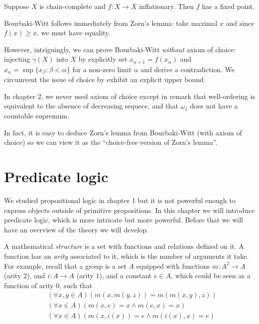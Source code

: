 \documentclass[a4paper]{article}
\begin{document}
\begin{theorem}
  Suppose \(X\) is chain-complete and \(f: X \to X\) inflationary. Then \(f\) has a fixed point.
\end{theorem}

Bourbaki-Witt follows immediately from Zorn's lemma: take maximal \(x\) and since \(f(x) \geq x\), we must have equality.

However, intriguingly, we can prove Bourbaki-Witt \emph{without} axiom of choice: injecting \(\gamma(X)\) into \(X\) by explicitly set \(x_{\alpha + 1} = f(x_\alpha)\) and \(x_\alpha = \sup\{x_\beta: \beta < \alpha\}\) for a non-zero limit \(\alpha\) and derive a contradiction. We circumvent the issue of choice by exhibit an explicit upper bound.

\begin{note}
  In chapter 2, we never used axiom of choice except in remark that well-ordering is equivalent to the absence of decreasing sequece, and that \(\omega_1\) does not have a countable supremum.
\end{note}

In fact, it is easy to deduce Zorn's lemma from Bourbaki-Witt (with axiom of choice) so we can view it as the ``choice-free version of Zorn's lemma''.

\section{Predicate logic}

We studied propositional logic in chapter 1 but it is not powerful enough to express objects outside of primitive propositions. In this chapter we will introduce predicate logic, which is more intricate but more powerful. Before that we will have an overview of the theory we will develop.

A mathematical \emph{structure} is a set with functions and relations defined on it. A function has an \emph{arity} associated to it, which is the number of arguments it take. For example, recall that a group is a set \(A\) equipped with functions \(m: A^2 \to A\) (arity \(2\)), and \(i: A \to A\) (arity \(1\)), and a constant \(e \in A\), which could be seen as a function of arity \(0\), such that
\begin{align*}
  & (\forall x, y \in A) (m(x, m(y, z)) = m(m(x, y), z)) \\
  & (\forall x \in A) (m(x, e) = x \land m(e, x) = x) \\
  & (\forall x \in A) (m(x, i(x)) = e \land m(i(x), x) = e)
\end{align*}
\end{document}
